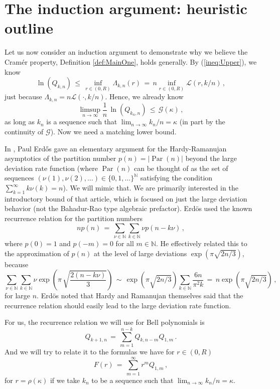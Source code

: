 \documentclass[12pt]{article}
\newcommand{\N}{\mathbb{N}}
\begin{document}
\section{The  induction argument: heuristic outline}


Let us now consider an induction argument to demonstrate why we believe the Cram\'er property,
Definition \ref{def:MainOne}, holds generally.
By (\ref{ineq:Upper}), we know
$$
\ln(Q_{k,n})\, \leq\, \inf_{r \in (0,R)} \Lambda_{k,n}(r)\, =\, n \inf_{r \in (0,R)} \mathcal{L}(r,k/n)\, ,
$$
just because $\Lambda_{k,n} = n \mathcal{L}(\cdot,k/n)$.
Hence, we already know
$$
\limsup_{n \to \infty} \frac{1}{n}\, \ln(Q_{k_n,n})\, \leq\, \mathcal{G}(\kappa)\, ,
$$
as long as $k_n$ is a sequence such that $\lim_{n \to \infty} k_n/n = \kappa$
(in part by the continuity of $\mathcal{G}$).
Now we need a matching lower bound.


In \cite{Erdos}, Paul Erd\H{o}s gave an elementary argument for the Hardy-Ramanujan
asymptotics of the partition number $p(n) = |\operatorname{Par}(n)|$
beyond the large deviation rate function
(where $\operatorname{Par}(n)$ can be thought of as 
the set of sequences $(\nu(1),\nu(2),\dots) \in \{0,1,\dots\}^{\N}$ satisfying the condition $\sum_{k=1}^{\infty} k \nu(k)=n$).
We will mimic that.
We are primarily interested in the introductory bound of that article, which is focused
on just the large deviation behavior (not the Bahadur-Rao type algebraic prefactor).
Erd\"os used the known recurrence relation for the partition numbers
$$
n p(n)\, =\, \sum_{\nu \in \N} \sum_{k \in \N} \nu p(n-k\nu)\, ,
$$
where $p(0)=1$ and $p(-m)=0$ for all $m \in \N$.
He effectively related this to the approximation of $p(n)$ at the level of large deviations $\exp(\pi \sqrt{2n/3})$, because
$$
\sum_{\nu \in \N} \sum_{k \in \N} \nu \exp\left(\pi\, \sqrt{\frac{2(n-k\nu)}{3}}\right)\,
\sim\, \exp(\pi \sqrt{2n/3}) \sum_{k\in \N} \frac{6n}{\pi^2 k}\, =\, n\exp(\pi \sqrt{2n/3})\, ,
$$
for large $n$.
Erd\"{o}s noted that Hardy and Ramanujan
themselves said that the recurrence relation should easily lead to the large deviation
rate function.

For us, the recurrence relation we will use for Bell polynomials is 
\begin{equation}
\label{eq:recurrenceHere}
Q_{k+1,n}\, =\, \sum_{m=1}^{n-k} Q_{k,n-m} Q_{1,m} \, .
\end{equation}
And we will try to relate it to the formulas we have for $r \in (0,R)$
$$
F(r)\, =\, \sum_{m=1}^{\infty} r^m Q_{1,m}\, ,
$$
for $r = \rho(\kappa)$ if we take $k_n$ to be a sequence such that 
$\lim_{n \to \infty} k_n/n = \kappa$.
\end{document}
